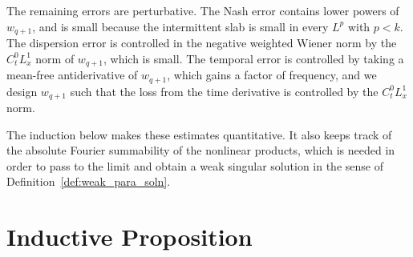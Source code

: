 \documentclass[12pt,reqno,letterpaper]{amsart}
\numberwithin{equation}{section}
\newcommand{\1}{{\bf 1}}
\newcommand{\2}{{\bf 2}}
\theoremstyle{remark}
\theoremstyle{remark}
\begin{document}
The remaining errors are perturbative. The Nash error contains lower powers of $w_{q+1}$, and is small because the intermittent slab is small in every $L^p$ with $p<k$. The dispersion error is controlled in the negative weighted Wiener norm by the $C_t^0L_x^1$ norm of $w_{q+1}$, which is small. The temporal error is controlled by taking a mean-free antiderivative of $w_{q+1}$, which gains a factor of frequency, and we design $w_{q+1}$ such that the loss from the time derivative is controlled by the $C_t^0L_x^1$ norm.

The induction below makes these estimates quantitative. It also keeps track of the absolute Fourier summability of the nonlinear products, which is needed in order to pass to the limit and obtain a weak singular solution in the sense of Definition~\ref{def:weak_para_soln}.

\section{Inductive Proposition}\label{sec:4}
\end{document}
